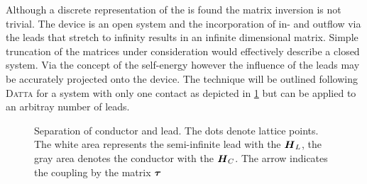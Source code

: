 Although a discrete representation of the \hamil{} is found the matrix inversion is not trivial. The device is an open system and the incorporation of in- and outflow via the leads that stretch to infinity results in an infinite dimensional matrix.
Simple truncation of the matrices under consideration would effectively describe a closed system. Via the concept of the self-energy however the influence of the leads may be accurately projected onto the device.
The technique will be outlined following \textsc{Datta} for a system with only one contact as depicted in \cref{fig:selfenergy} but can be applied to an arbitray number of leads. \begin{figure}[h!]
\centering
{}
\caption{Separation of conductor and lead. The dots denote lattice points. The white area represents the semi-infinite lead with the \hamil{} $\boldsymbol{H}_L$, the gray area denotes the conductor with the \hamil{} $\boldsymbol{H}_C$. The arrow indicates the coupling by the matrix $\boldsymbol{\tau}$}
\label{fig:selfenergy}
\end{figure}
